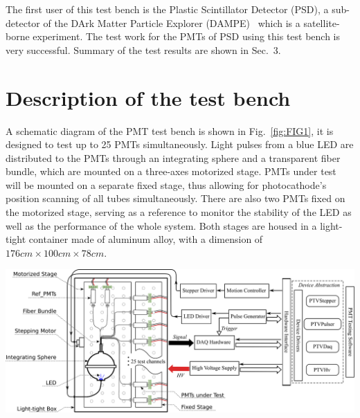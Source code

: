 \documentclass[a4paper,10pt,twoside]{cpc-hepnp}
\begin{document}
\begin{CJK*}{UTF8}{gbsn}
\begin{multicols}{2}
The first user of this test bench is the Plastic Scintillator Detector (PSD), a sub-detector of the DArk Matter Particle Explorer (DAMPE)~\citep{Chang_Jin_dampe} which is a satellite-borne experiment. 
The test work for the PMTs of PSD using this test bench is very successful. Summary of the test results are shown in Sec.~3.

\section{Description of the test bench}
\label{sec:description}
	
A schematic diagram of the PMT test bench is shown in Fig.~\ref{fig:FIG1}, it is designed to test up to 25 PMTs simultaneously.
Light pulses from a blue LED are distributed to the PMTs through an integrating sphere and a transparent fiber bundle, which are mounted on a three-axes motorized stage.
PMTs under test will be mounted on a separate fixed stage, thus allowing for photocathode's position scanning of all tubes simultaneously.
There are also two PMTs fixed on the motorized stage, serving as a reference to monitor the stability of the LED as well as the performance of the whole system.
Both stages are housed in a light-tight container made of aluminum alloy, with a dimension of $176cm\times100cm\times78cm$.

\end{multicols}
\begin{center}
	\includegraphics[width=140mm]{FIG1}
\end{center}
\begin{multicols}{2}
	

\end{multicols}
\end{CJK*}
\end{document}
